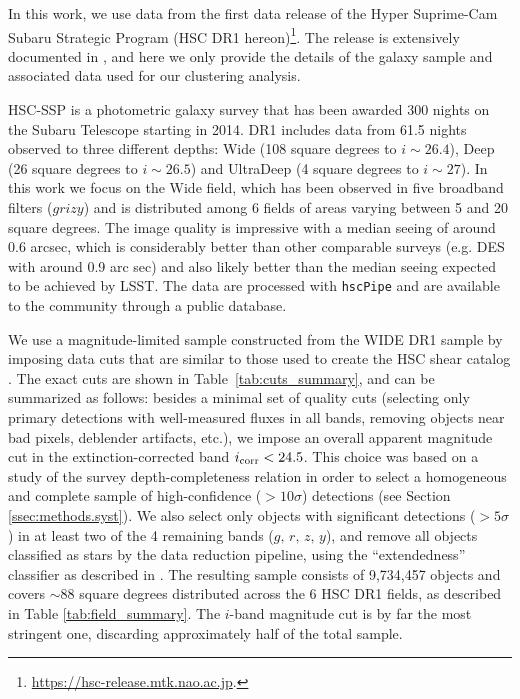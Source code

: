 \documentclass[a4paper,11pt]{article}
\begin{document}
  In this work, we use data from the first data release of the Hyper Suprime-Cam Subaru Strategic Program (HSC DR1 hereon)\footnote{\url{https://hsc-release.mtk.nao.ac.jp}.}. The release is extensively documented in \cite{2018PASJ...70S...8A}, and here we only provide the details of the galaxy sample and associated data used for our clustering analysis.

  HSC-SSP is a photometric galaxy survey that has been awarded 300 nights on the Subaru Telescope starting in 2014. DR1 includes data from 61.5 nights observed to three different depths: Wide (108 square degrees to $i\sim 26.4$), Deep (26 square degrees to $i\sim26.5$) and UltraDeep (4 square degrees to $i\sim 27$). In this work we focus on the Wide field, which has been observed in five broadband filters ($grizy$) and is distributed among 6 fields  of areas varying between 5 and 20 square degrees. The image quality is impressive with a median seeing of around 0.6 arcsec, which is considerably better than other comparable surveys (e.g. DES with around 0.9 arc sec) and also likely better than the median seeing expected to be achieved by LSST. The data are processed with \texttt{hscPipe} \cite{2018PASJ...70S...5B} and are available to the community through a public database.
  
  We use a magnitude-limited sample constructed from the WIDE DR1 sample by imposing data cuts that are similar to those used to create the HSC shear catalog \cite{2018PASJ...70S..25M}. The exact cuts are shown in Table~\ref{tab:cuts_summary}, and can be summarized as follows: besides a minimal set of quality cuts (selecting only primary detections with well-measured fluxes in all bands, removing objects near bad pixels, deblender artifacts, etc.), we impose an overall apparent magnitude cut in the extinction-corrected band $i_{\rm corr}<24.5$. This choice was based on a study of the survey depth-completeness relation in order to select a homogeneous and complete sample of high-confidence ($>10\sigma$) detections (see Section \ref{ssec:methods.syst}). We also select only objects with significant detections ($>5\sigma$) in at least two of the 4 remaining bands ($g,\,r,\,z,\,y$), and remove all objects classified as stars by the data reduction pipeline, using the ``extendedness'' classifier as described in \cite{2018PASJ...70S..25M,2018PASJ...70S...5B}. The resulting sample consists of 9,734,457 objects and covers $\sim88$ square degrees distributed across the 6 HSC DR1 fields, as described in Table \ref{tab:field_summary}. The $i$-band magnitude cut is by far the most stringent one, discarding approximately half of the total sample.
\end{document}
